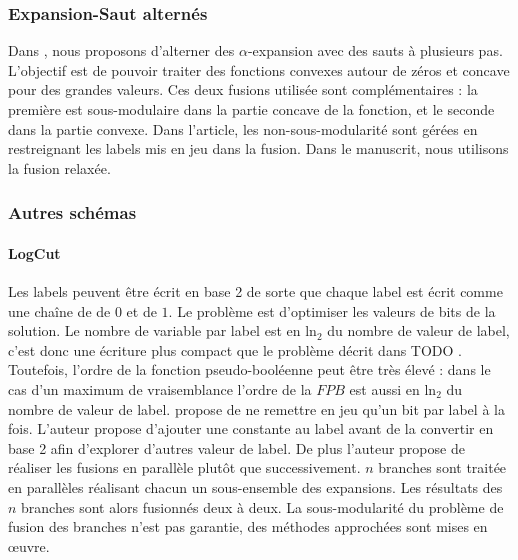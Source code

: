 \documentclass[../main/These_Mathias_Paget.tex]{subfiles}
\begin{document}
\subsubsection{Expansion-Saut alternés}
	\label{sss:ICIP1}

	Dans \cite{Paget15ICIP}, nous proposons d'alterner des $\alpha$-expansion avec des sauts à plusieurs pas. L'objectif est de pouvoir traiter des fonctions convexes autour de zéros et concave pour des grandes valeurs. Ces deux fusions utilisée sont complémentaires : la première est sous-modulaire dans la partie concave de la fonction, et le seconde dans la partie convexe. Dans l'article, les non-sous-modularité sont gérées en restreignant les labels mis en jeu dans la fusion. Dans le manuscrit, nous utilisons la fusion relaxée.

\subsubsection{Autres schémas}

	\paragraph*{LogCut}
	Les labels peuvent être écrit en base 2 de sorte que chaque label est écrit comme une chaîne de de $0$ et de $1$. Le problème est d'optimiser les valeurs de bits de la solution. Le nombre de variable par label est en $\text{ln}_{2}$ du nombre de valeur de label, c'est donc une écriture plus compact que le problème décrit dans TODO . Toutefois, l'ordre de la fonction pseudo-booléenne peut être très élevé : dans le cas d'un maximum de vraisemblance l'ordre de la $FPB$ est aussi en $\text{ln}_{2}$ du nombre de valeur de label.\cite{Lempitsky10PAMI} propose de ne remettre en jeu qu'un bit par label à la fois. L'auteur propose d'ajouter une constante au label avant de la convertir en base 2 afin d'explorer d'autres valeur de label.
De plus l'auteur propose de réaliser les fusions en parallèle plutôt que successivement. $n$ branches sont traitée en parallèles réalisant chacun un sous-ensemble des expansions. Les résultats des $n$ branches sont alors fusionnés deux à deux. La sous-modularité du problème de fusion des branches n'est pas garantie, des méthodes approchées sont mises en œuvre.
\end{document}
